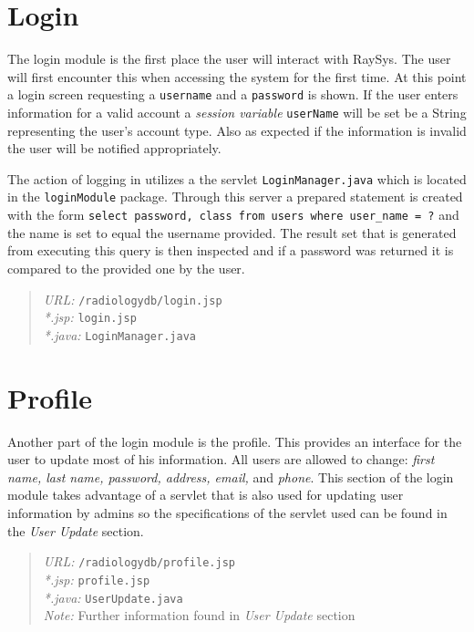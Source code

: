 \documentclass[11pt]{report}
\begin{document}
\section*{Login}

The login module is the first place the user will interact with RaySys. The user will first encounter this when accessing the system for the first time. At this point a login screen requesting a \texttt{username} and a \texttt{password} is shown. If the user enters information for a valid account a \emph{session variable} \texttt{userName} will be set be a String representing the user's account type. Also as expected if the information is invalid the user will be notified appropriately.

The action of logging in utilizes a the servlet \texttt{LoginManager.java} which is located in the \texttt{loginModule} package. Through this server a prepared statement is created with the form \texttt{select password, class from users where user\_name = ?} and the name is set to equal the username provided. The result set that is generated from executing this query is then inspected and if a password was returned it is compared to the provided one by the user.

\begin{quote}
\emph{URL:} \texttt{/radiologydb/login.jsp} \\
\emph{*.jsp: } \texttt{login.jsp} \\
\emph{*.java: } \texttt{LoginManager.java}
\end{quote}

\section*{Profile}
Another part of the login module is the profile. This provides an interface for the user to update most of his information. All users are allowed to change: \emph{first name, last name, password, address, email,} and \emph{ phone}. This section of the login module takes advantage of a servlet that is also used for updating user information by admins so the specifications of the servlet used can be found in the \emph{User Update} section.

\begin{quote}
\emph{URL:} \texttt{/radiologydb/profile.jsp} \\
\emph{*.jsp: } \texttt{profile.jsp} \\
\emph{*.java: } \texttt{UserUpdate.java}\\
\emph{Note:} Further information found in \emph{User Update} section
\end{quote}
\end{document}
